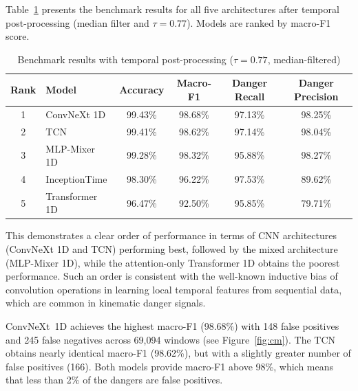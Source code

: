 \documentclass[3p,times,procedia]{elsarticle}
\begin{document}
Table~\ref{tab:results} presents the benchmark results for all five architectures after temporal post-processing (median filter and $\tau = 0.77$). Models are ranked by macro-F1 score.

\begin{table}[h!]
    \caption{Benchmark results with temporal post-processing ($\tau = 0.77$, median-filtered)}
    \label{tab:results}
    \centering
    \footnotesize
    \setlength{\tabcolsep}{3pt}
    \begin{tabular}{@{}clcccc@{}}
        \toprule
        \textbf{Rank} & \textbf{Model} & \textbf{Accuracy} & \textbf{Macro-F1} & \textbf{Danger Recall} & \textbf{Danger Precision} \\
        \midrule
        1             & ConvNeXt 1D    & 99.43\%           & 98.68\%           & 97.13\%                & 98.25\%                   \\
        2             & TCN            & 99.41\%           & 98.62\%           & 97.14\%                & 98.04\%                   \\
        3             & MLP-Mixer 1D   & 99.28\%           & 98.32\%           & 95.88\%                & 98.27\%                   \\
        4             & InceptionTime  & 98.30\%           & 96.22\%           & 97.53\%                & 89.62\%                   \\
        5             & Transformer 1D & 96.47\%           & 92.50\%           & 95.85\%                & 79.71\%                   \\
        \bottomrule
    \end{tabular}
\end{table}

This demonstrates a clear order of performance in terms of CNN architectures (ConvNeXt 1D and TCN) performing best, followed by the mixed architecture (MLP-Mixer 1D), while the attention-only Transformer 1D obtains the poorest performance. Such an order is consistent with the well-known inductive bias of convolution operations in learning local temporal features from sequential data, which are common in kinematic danger signals.

ConvNeXt~1D achieves the highest macro-F1 (98.68\%) with 148 false positives and 245 false negatives across 69,094 windows (see Figure~\ref{fig:cm}). The TCN obtains nearly identical macro-F1 (98.62\%), but with a slightly greater number of false positives (166). Both models provide macro-F1 above 98\%, which means that less than 2\% of the dangers are false positives.
\end{document}
